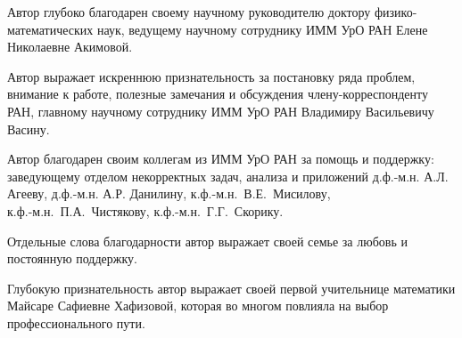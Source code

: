 Автор глубоко благодарен своему научному руководителю доктору физико-математических наук, ведущему научному сотруднику ИММ УрО РАН Елене Николаевне Акимовой.

Автор выражает искреннюю признательность за постановку ряда проблем, внимание к работе, полезные замечания и обсуждения члену-корреспонденту РАН, главному научному сотруднику ИММ УрО РАН Владимиру Васильевичу Васину.

Автор благодарен своим коллегам из ИММ УрО РАН за помощь и поддержку: заведующему отделом некорректных задач, анализа и приложений д.ф.-м.н. А.Л. Агееву, д.ф.-м.н. А.Р. Данилину, к.ф.-м.н.~В.Е.~Мисилову, \\к.ф.-м.н.~П.А.~Чистякову, к.ф.-м.н.~Г.Г.~Скорику.

Отдельные слова благодарности автор выражает своей семье за любовь и постоянную поддержку.

Глубокую признательность автор выражает своей первой учительнице математики Майсаре Сафиевне Хафизовой, которая во многом повлияла на выбор профессионального пути.


